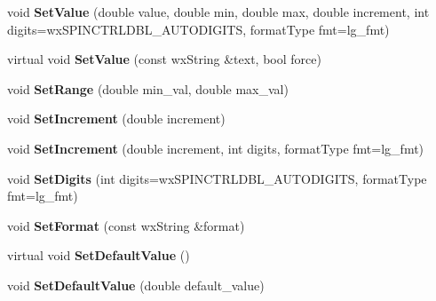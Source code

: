 \begin{DoxyCompactItemize}
\item 
\hypertarget{classwx_spin_ctrl_dbl_aefdbc3adbd1f11c884318a6682c0f32d}{void {\bfseries Set\+Value} (double value, double min, double max, double increment, int digits=wx\+S\+P\+I\+N\+C\+T\+R\+L\+D\+B\+L\+\_\+\+A\+U\+T\+O\+D\+I\+G\+I\+T\+S, format\+Type fmt=lg\+\_\+fmt)}\label{classwx_spin_ctrl_dbl_aefdbc3adbd1f11c884318a6682c0f32d}

\item 
\hypertarget{classwx_spin_ctrl_dbl_a2a97fcc33b12927628bbc8cb80ad7d00}{virtual void {\bfseries Set\+Value} (const wx\+String \&text, bool force)}\label{classwx_spin_ctrl_dbl_a2a97fcc33b12927628bbc8cb80ad7d00}

\item 
\hypertarget{classwx_spin_ctrl_dbl_a5b749de03f9c0c08aa804fe0d52aca87}{void {\bfseries Set\+Range} (double min\+\_\+val, double max\+\_\+val)}\label{classwx_spin_ctrl_dbl_a5b749de03f9c0c08aa804fe0d52aca87}

\item 
\hypertarget{classwx_spin_ctrl_dbl_a6804a5e633e050b4ed75a523df0a7d44}{void {\bfseries Set\+Increment} (double increment)}\label{classwx_spin_ctrl_dbl_a6804a5e633e050b4ed75a523df0a7d44}

\item 
\hypertarget{classwx_spin_ctrl_dbl_a46bed5d430fdd860375417dd9ce18a14}{void {\bfseries Set\+Increment} (double increment, int digits, format\+Type fmt=lg\+\_\+fmt)}\label{classwx_spin_ctrl_dbl_a46bed5d430fdd860375417dd9ce18a14}

\item 
\hypertarget{classwx_spin_ctrl_dbl_a4adf06020a64f21b6a9daced4be87ac3}{void {\bfseries Set\+Digits} (int digits=wx\+S\+P\+I\+N\+C\+T\+R\+L\+D\+B\+L\+\_\+\+A\+U\+T\+O\+D\+I\+G\+I\+T\+S, format\+Type fmt=lg\+\_\+fmt)}\label{classwx_spin_ctrl_dbl_a4adf06020a64f21b6a9daced4be87ac3}

\item 
\hypertarget{classwx_spin_ctrl_dbl_afe97ba70a67fe135e8f75531577ef323}{void {\bfseries Set\+Format} (const wx\+String \&format)}\label{classwx_spin_ctrl_dbl_afe97ba70a67fe135e8f75531577ef323}

\item 
\hypertarget{classwx_spin_ctrl_dbl_acc086ab3eb27114d2746e501d0a118ec}{virtual void {\bfseries Set\+Default\+Value} ()}\label{classwx_spin_ctrl_dbl_acc086ab3eb27114d2746e501d0a118ec}

\item 
\hypertarget{classwx_spin_ctrl_dbl_a7a9e5e7d45dc26d0d9c7e3a732655f3d}{void {\bfseries Set\+Default\+Value} (double default\+\_\+value)}\label{classwx_spin_ctrl_dbl_a7a9e5e7d45dc26d0d9c7e3a732655f3d}


\end{DoxyCompactItemize}
